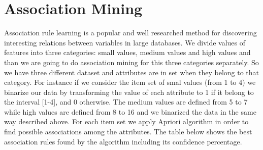\chapter*{Association Mining}

Association rule learning is a popular and well researched method for discovering interesting relations between variables in large databases. We divide values of features into three categories: small values, medium values and high values and than we are going to do association mining for this three categories separately. So we have three different dataset and attributes are in set when they belong to that category. For instance if we consider the item set of smal values (from 1 to 4)
  we binarize our data by transforming the value of each attribute to 1 if it belong to the interval [1-4], and 0 otherwise. The medium values are defined from 5 to 7 while   high values are defined from 8 to 16 and we binarized the data in the same way described above.
  For each item set we apply Apriori algorithm in order to find possible associations among the attributes.
\clearpage
  The table below shows the best association rules found by the algorithm including its confidence percentage.

